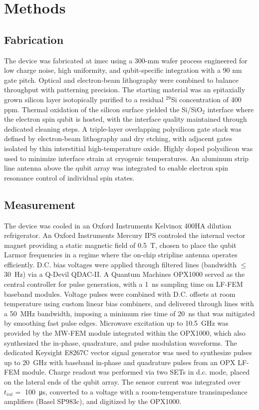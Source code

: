 \documentclass[superscriptaddress,twocolumn,10pt,prl,floatfix,nofootinbib,aps]{revtex4-2}
\begin{document}
\section{Methods}

\subsection{Fabrication}
\noindent
The device was fabricated at imec using a  300-mm wafer process engineered for low charge noise, high uniformity, and qubit-specific integration with a 90 nm gate pitch\cite{elsayed_low_2024, li_flexible_2021}. Optical and electron-beam lithography were combined to balance throughput with patterning precision. The starting material was an epitaxially grown silicon layer isotopically purified to a residual $^{29}$Si concentration of 400 ppm. Thermal oxidation of the silicon surface yielded the Si/SiO$_2$ interface where the electron spin qubit is hosted, with the interface quality maintained through dedicated cleaning steps. A triple-layer overlapping polysilicon gate stack was defined by electron-beam lithography and dry etching, with adjacent gates isolated by thin interstitial high-temperature oxide. Highly doped polysilicon was used to minimize interface strain at cryogenic temperatures. An aluminum strip line antenna above the qubit array was integrated to enable electron spin resonance control of individual spin states.

\subsection{Measurement}
\noindent
The device was cooled in an Oxford Instruments Kelvinox 400HA dilution refrigerator. An Oxford Instruments Mercury IPS controled the internal vector magnet providing a static magnetic field of \SI{0.5}{\tesla}, chosen to place the qubit Larmor frequencies in a regime where the on-chip stripline antenna operates efficiently.
D.C. bias voltages were applied through filtered lines (bandwidth $\leq$ \SI{30}{\hertz}) via a Q-Devil QDAC-II. A Quantum Machines OPX1000 served as the central controller for pulse generation, with a  \SI{1}{\nano\second} sampling time on LF-FEM baseband modules. Voltage pulses were combined with D.C. offsets at room temperature using custom linear bias combiners, and delivered through lines with a \SI{50}{\mega\hertz} bandwidth, imposing a minimum rise time of \SI{20}{\nano\second} that was mitigated by smoothing fast pulse edges. Microwave excitation up to \SI{10.5}{\giga\hertz} was provided by the MW-FEM module integrated within the OPX1000, which also synthesized the in-phase, quadrature, and pulse modulation waveforms. The dedicated Keysight E8267C vector signal generator was used to synthesize pulses up to \SI{20}{\giga\hertz} with baseband in-phase and quadrature pulses from an OPX LF-FEM module.
Charge readout was performed via two SETs in d.c. mode, placed on the lateral ends of the qubit array. The sensor current was integrated over $t_{int} =$ \SI{100}{\micro\second}, converted to a voltage with a room-temperature transimpedance amplifiers (Basel SP983c), and digitized by the OPX1000.
\end{document}
